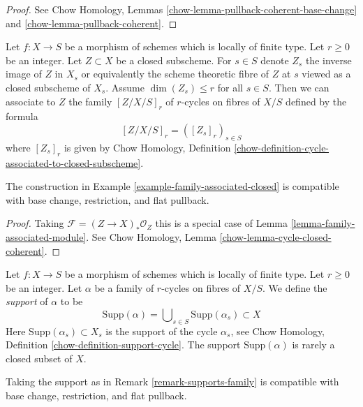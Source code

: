 \begin{proof}
See Chow Homology, Lemmas
\ref{chow-lemma-pullback-coherent-base-change} and
\ref{chow-lemma-pullback-coherent}.
\end{proof}

\begin{example}
\label{example-family-associated-closed}
Let $f : X \to S$ be a morphism of schemes which is locally of finite type.
Let $r \geq 0$ be an integer. Let $Z \subset X$ be a closed subscheme.
For $s \in S$ denote $Z_s$ the inverse image of $Z$ in $X_s$
or equivalently the scheme theoretic fibre of $Z$ at $s$ viewed
as a closed subscheme of $X_s$.
Assume $\dim(Z_s) \leq r$ for all $s \in S$.
Then we can associate to $Z$ the family $[Z/X/S]_r$
of $r$-cycles on fibres of $X/S$ defined by the formula
$$
[Z/X/S]_r = ([Z_s]_r)_{s \in S}
$$
where $[Z_s]_r$ is given by
Chow Homology, Definition
\ref{chow-definition-cycle-associated-to-closed-subscheme}.
\end{example}

\begin{lemma}
\label{lemma-family-associated-closed}
The construction in Example \ref{example-family-associated-closed}
is compatible with base change, restriction, and flat pullback.
\end{lemma}

\begin{proof}
Taking $\mathcal{F} = (Z \to X)_*\mathcal{O}_Z$ this is a special case of
Lemma \ref{lemma-family-associated-module}. See
Chow Homology, Lemma \ref{chow-lemma-cycle-closed-coherent}.
\end{proof}

\begin{remark}[Support]
\label{remark-supports-family}
Let $f : X \to S$ be a morphism of schemes which is locally of finite type.
Let $r \geq 0$ be an integer. Let $\alpha$ be a family of $r$-cycles
on fibres of $X/S$. We define the {\it support} of $\alpha$ to be
$$
\text{Supp}(\alpha) =
\bigcup\nolimits_{s \in S} \text{Supp}(\alpha_s) \subset X
$$
Here $\text{Supp}(\alpha_s) \subset X_s$ is the
support of the cycle $\alpha_s$, see
Chow Homology, Definition \ref{chow-definition-support-cycle}.
The support $\text{Supp}(\alpha)$ is rarely a closed subset of $X$.
\end{remark}

\begin{lemma}
\label{lemma-support-family}
Taking the support as in Remark \ref{remark-supports-family}
is compatible with base change, restriction, and flat pullback.
\end{lemma}

